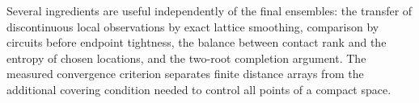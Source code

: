 Several ingredients are useful independently of the final ensembles:
the transfer of discontinuous local observations by exact lattice
smoothing, comparison by circuits before endpoint tightness, the
balance between contact rank and the entropy of chosen locations, and
the two-root completion argument. The measured convergence criterion
separates finite distance arrays from the additional covering condition
needed to control all points of a compact space.
